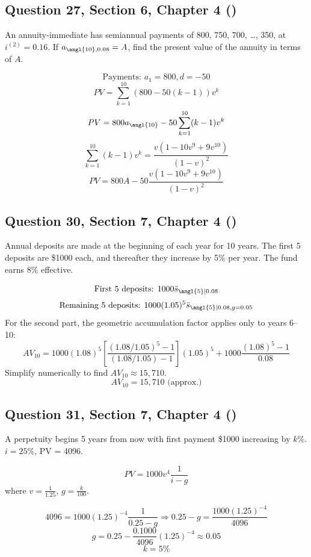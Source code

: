 \documentclass[12pt, a4paper]{article}
\begin{document}
\subsection*{Question 27, Section 6, Chapter 4  (\cite{toi3rd})}

\noindent An annuity-immediate has semiannual payments of 800, 750, 700, \dots, 350, at \( i^{(2)} = 0.16. \)  
If \( a_{\angl{10}, 0.08} = A \), find the present value of the annuity in terms of \( A. \)

\[
\text{Payments: } a_1 = 800, d = -50
\]
\[
PV = \sum_{k=1}^{10} (800 - 50(k-1))v^k
\]
\[
PV = 800 a_{\angl{10}} - 50 \sum_{k=1}^{10}(k-1)v^k
\]
\[
\sum_{k=1}^{10}(k-1)v^k = \frac{v(1 - 10v^9 + 9v^{10})}{(1 - v)^2}
\]
\[
\boxed{PV = 800A - 50 \frac{v(1 - 10v^9 + 9v^{10})}{(1 - v)^2}}
\]

\subsection*{Question 30, Section 7, Chapter 4  (\cite{toi3rd})}

Annual deposits are made at the beginning of each year for 10 years.  
The first 5 deposits are \$1000 each, and thereafter they increase by 5\% per year.  
The fund earns 8\% effective.

\[
\text{First 5 deposits: } 1000 \ddot{s}_{\angl{5}|0.08}
\]
\[
\text{Remaining 5 deposits: } 1000(1.05)^5 \ddot{s}_{\angl{5}|0.08, g=0.05}
\]
For the second part, the geometric accumulation factor applies only to years 6–10:
\[
AV_{10} = 1000(1.08)^5 \left[\frac{(1.08/1.05)^5 - 1}{(1.08/1.05) - 1}\right] (1.05)^5 + 1000 \frac{(1.08)^5 - 1}{0.08}
\]
Simplify numerically to find \( AV_{10} \approx 15{,}710 \).
\[
\boxed{AV_{10} = 15{,}710 \text{ (approx.)}}
\]

\subsection*{Question 31, Section 7, Chapter 4  (\cite{toi3rd})}

A perpetuity begins 5 years from now with first payment \$1000 increasing by \(k\%\).  
\(i = 25\%\), PV = 4096.

\[
PV = 1000 v^4 \frac{1}{i - g}
\]
where \(v = \frac{1}{1.25}\), \(g = \frac{k}{100}\).

\[
4096 = 1000 (1.25)^{-4} \frac{1}{0.25 - g}
\Rightarrow 0.25 - g = \frac{1000 (1.25)^{-4}}{4096}
\]
\[
g = 0.25 - \frac{0.1000}{4096} (1.25)^{-4} \approx 0.05
\]
\[
\boxed{k = 5\%}
\]
\end{document}
